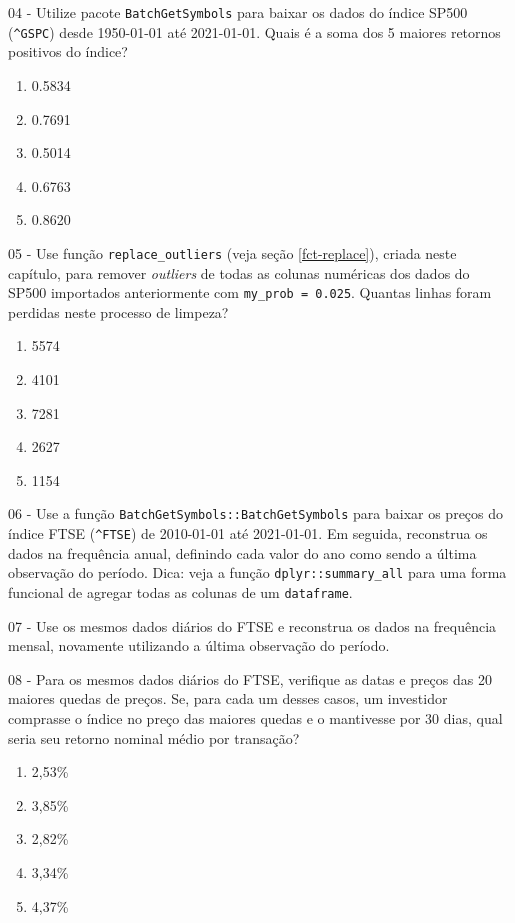 \documentclass[
  11pt,
]{book}
\providecommand{\tightlist}{%
  \setlength{\itemsep}{0pt}\setlength{\parskip}{0pt}}
\begin{document}
04 -
Utilize pacote \texttt{BatchGetSymbols} para baixar os dados do índice SP500 (\texttt{\textquotesingle{}\^{}GSPC\textquotesingle{}}) desde 1950-01-01 até 2021-01-01. Quais é a soma dos 5 maiores retornos positivos do índice?

\begin{enumerate}
\def\labelenumi{\alph{enumi})}
\tightlist
\item
  0.5834
\item
  0.7691
\item
  0.5014
\item
  0.6763
\item
  0.8620
\end{enumerate}

05 -
Use função \texttt{replace\_outliers} (veja seção \ref{fct-replace}), criada neste capítulo, para remover \emph{outliers} de todas as colunas numéricas dos dados do SP500 importados anteriormente com \texttt{my\_prob\ =\ 0.025}. Quantas linhas foram perdidas neste processo de limpeza?

\begin{enumerate}
\def\labelenumi{\alph{enumi})}
\tightlist
\item
  5574
\item
  4101
\item
  7281
\item
  2627
\item
  1154
\end{enumerate}

06 -
Use a função \texttt{BatchGetSymbols::BatchGetSymbols} para baixar os preços do índice FTSE (\texttt{\textquotesingle{}\^{}FTSE\textquotesingle{}}) de 2010-01-01 até 2021-01-01. Em seguida, reconstrua os dados na frequência anual, definindo cada valor do ano como sendo a última observação do período. Dica: veja a função \texttt{dplyr::summary\_all} para uma forma funcional de agregar todas as colunas de um \texttt{dataframe}.

07 -
Use os mesmos dados diários do FTSE e reconstrua os dados na frequência mensal, novamente utilizando a última observação do período.

08 -
Para os mesmos dados diários do FTSE, verifique as datas e preços das 20 maiores quedas de preços. Se, para cada um desses casos, um investidor comprasse o índice no preço das maiores quedas e o mantivesse por 30 dias, qual seria seu retorno nominal médio por transação?

\begin{enumerate}
\def\labelenumi{\alph{enumi})}
\tightlist
\item
  2,53\%
\item
  3,85\%
\item
  2,82\%
\item
  3,34\%
\item
  4,37\%
\end{enumerate}
\end{document}
